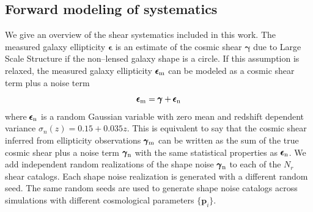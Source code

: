 \documentclass[reprint,aps,prd,superscriptaddress,showkeys,showpacs]{revtex4-1}
\newcommand{\bb}[1]{\mathbf{#1}}
\begin{document}

\subsection{Forward modeling of systematics}
We give an overview of the shear systematics included in this work. The measured galaxy ellipticity $\pmb{\epsilon}$ is an estimate of the cosmic shear $\pmb{\gamma}$ due to Large Scale Structure if the non--lensed galaxy shape is a circle. If this assumption is relaxed, the measured galaxy ellipticity $\pmb{\epsilon}_{\rm m}$ can be modeled as a cosmic shear term plus a noise term \citep{wlreview}
\begin{equation}
\pmb{\epsilon}_{\rm m} = \pmb{\gamma} + \pmb{\epsilon}_{\rm n}
\end{equation} 
%
where $\pmb{\epsilon}_{\rm n}$ is a random Gaussian variable with zero mean and redshift dependent variance $\sigma_n(z)=0.15+0.035z$. This is equivalent to say that the cosmic shear inferred from ellipticity observations $\pmb{\gamma}_{\rm m}$ can be written as the sum of the true cosmic shear plus a noise term $\pmb{\gamma}_{\rm n}$ with the same statistical properties as $\pmb{\epsilon}_{\rm n}$. 
We add independent random realizations of the shape noise $\pmb{\gamma}_{\rm n}$ to each of the $N_r$ shear catalogs. Each shape noise realization is generated with a different random seed. The same random seeds are used to generate shape noise catalogs across simulations with different cosmological parameters $\{\bb{p}_i\}$.
\end{document}
